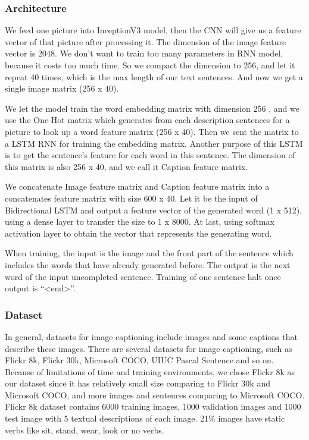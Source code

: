 \documentclass{article}
\begin{document}
\subsubsection{Architecture}
We feed one picture into InceptionV3 model, then the CNN will give us a feature vector of that picture after processing it. The dimension of the image feature vector is 2048. We don’t want to train too many parameters in RNN model, because it costs too much time. So we compact the dimension to 256, and let it repeat 40 times, which is the max length of our text sentences. And now we get a single image matrix (256 x 40).

We let the model train the word embedding matrix with dimension 256 , and we use the One-Hot matrix which generates from each description sentences for a picture to look up a word feature matrix (256 x 40). Then we sent the matrix to a LSTM RNN for training the embedding matrix. Another purpose of this LSTM is to get the sentence’s feature for each word in this sentence. The dimension of this matrix is also 256 x 40, and we call it Caption feature matrix.  

We concatenate Image feature matrix and Caption feature matrix into a concatenates feature matrix with size 600 x 40. Let it be the input of Bidirectional LSTM and output a feature vector of the generated word (1 x 512), using a dense layer to transfer the size to 1 x 8000. At last, using softmax activation layer to obtain the vector that represents the generating word.

When training, the input is the image and the front part of the sentence which includes the words that have already generated before. The output is the next word of the input uncompleted sentence. Training of one sentence halt once output is “<end>”.

\subsubsection{Dataset}

In general, datasets for image captioning include images and some captions that describe these images. There are several datasets for image captioning, such as Flickr 8k, Flickr 30k, Microsoft COCO, UIUC Pascal Sentence and so on. Because of limitations of time and training environments, we chose Flickr 8k as our dataset since it has relatively small size comparing to Flickr 30k and Microsoft COCO, and more images and sentences comparing to Microsoft COCO. Flickr 8k dataset contains 6000 training images, 1000 validation images and 1000 test image with 5 textual descriptions of each image. 21\% images have static verbs like sit, stand, wear, look or no verbs.
\end{document}

